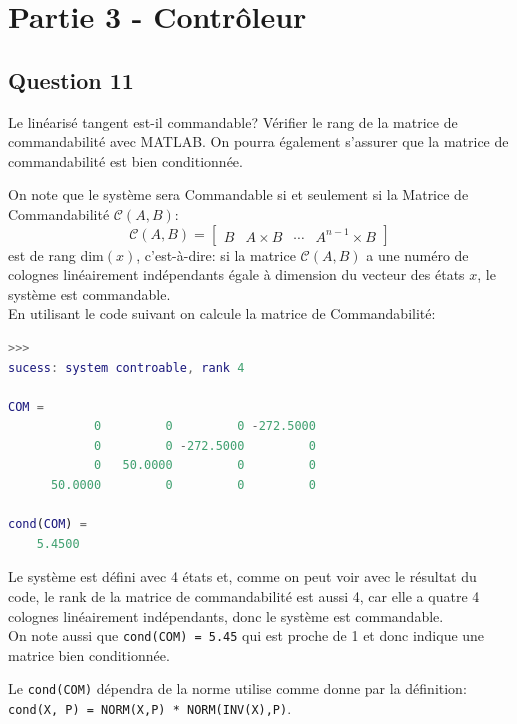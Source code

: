 \documentclass[class=article, crop=false]{standalone}
\begin{document}
\section{Partie 3 - Contrôleur}
\subsection{Question 11}\label{Q11}
\begin{exercise}
    Le linéarisé tangent est-il commandable? Vérifier le rang de la matrice de commandabilité avec MATLAB. On pourra également s'assurer que la matrice de commandabilité est bien conditionnée.
\end{exercise}
\begin{resolution}
    On note que le système sera Commandable si et seulement si la Matrice de Commandabilité $\mathcal{C}(A, B)$:
    \begin{equation}
        \boxed{
            \mathcal{C}(A, B) = 
            \begin{bmatrix}
                B & A\times B & \cdots & A^{n-1}\times B
            \end{bmatrix}
        }
    \end{equation}
    est de rang dim$(x)$, c'est-à-dire: si la matrice $\mathcal{C}(A, B)$ a une numéro de colognes linéairement indépendants égale à dimension du vecteur des états $x$, le système est commandable.\\
    
    En utilisant le code suivant on calcule la matrice de Commandabilité:
    \begin{scriptsize}\mycode
        
    \end{scriptsize}
    \begin{scriptsize}\mycode
        \begin{lstlisting}[language=Matlab]
>>>
sucess: system controable, rank 4

COM =
            0         0         0 -272.5000
            0         0 -272.5000         0
            0   50.0000         0         0
      50.0000         0         0         0

cond(COM) =
    5.4500
        \end{lstlisting}
    \end{scriptsize}
    Le système est défini avec 4 états et, comme on peut voir avec le résultat du code, le rank de la matrice de commandabilité est aussi 4, car elle a quatre 4 colognes linéairement indépendants, donc le système est commandable.\\

    On note aussi que \texttt{cond(COM) = 5.45} qui est proche de 1 et donc indique une matrice bien conditionnée. 
    
    \begin{remark}
        Le \texttt{cond(COM)} dépendra de la norme utilise comme donne par la définition: \texttt{cond(X, P) = NORM(X,P) * NORM(INV(X),P)}.
    \end{remark}
\end{resolution}
\end{document}
